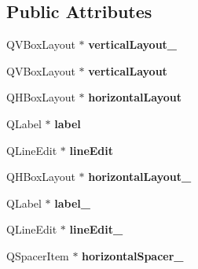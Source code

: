\subsection*{Public Attributes}
\begin{DoxyCompactItemize}
\item 
\hypertarget{classUi__PlayerDialog_a74a12afbe6f09465dc1767c5868351f7}{Q\-V\-Box\-Layout $\ast$ {\bfseries vertical\-Layout\-\_}}\label{classUi__PlayerDialog_a74a12afbe6f09465dc1767c5868351f7}

\item 
\hypertarget{classUi__PlayerDialog_afab06d2130637ccad71826f9888f1e08}{Q\-V\-Box\-Layout $\ast$ {\bfseries vertical\-Layout}}\label{classUi__PlayerDialog_afab06d2130637ccad71826f9888f1e08}

\item 
\hypertarget{classUi__PlayerDialog_a1cb63a2779b36cced50dfc985d20ed7b}{Q\-H\-Box\-Layout $\ast$ {\bfseries horizontal\-Layout}}\label{classUi__PlayerDialog_a1cb63a2779b36cced50dfc985d20ed7b}

\item 
\hypertarget{classUi__PlayerDialog_a656e4cebd17a01eee97530f41b1d6bf5}{Q\-Label $\ast$ {\bfseries label}}\label{classUi__PlayerDialog_a656e4cebd17a01eee97530f41b1d6bf5}

\item 
\hypertarget{classUi__PlayerDialog_a872ef92a5dd2eaeff2359e7adf03a4b6}{Q\-Line\-Edit $\ast$ {\bfseries line\-Edit}}\label{classUi__PlayerDialog_a872ef92a5dd2eaeff2359e7adf03a4b6}

\item 
\hypertarget{classUi__PlayerDialog_a0cc8a928a185491f8fe3a6cff4091f15}{Q\-H\-Box\-Layout $\ast$ {\bfseries horizontal\-Layout\-\_}}\label{classUi__PlayerDialog_a0cc8a928a185491f8fe3a6cff4091f15}

\item 
\hypertarget{classUi__PlayerDialog_a78c550de67687e19505fc3c851e339f7}{Q\-Label $\ast$ {\bfseries label\-\_}}\label{classUi__PlayerDialog_a78c550de67687e19505fc3c851e339f7}

\item 
\hypertarget{classUi__PlayerDialog_a3cd2d4e9c29c77c90b34ec0fdfcf8357}{Q\-Line\-Edit $\ast$ {\bfseries line\-Edit\-\_}}\label{classUi__PlayerDialog_a3cd2d4e9c29c77c90b34ec0fdfcf8357}

\item 
\hypertarget{classUi__PlayerDialog_a3078a35028ed550f8a1f89e7af4d4663}{Q\-Spacer\-Item $\ast$ {\bfseries horizontal\-Spacer\-\_}}\label{classUi__PlayerDialog_a3078a35028ed550f8a1f89e7af4d4663}


\end{DoxyCompactItemize}
